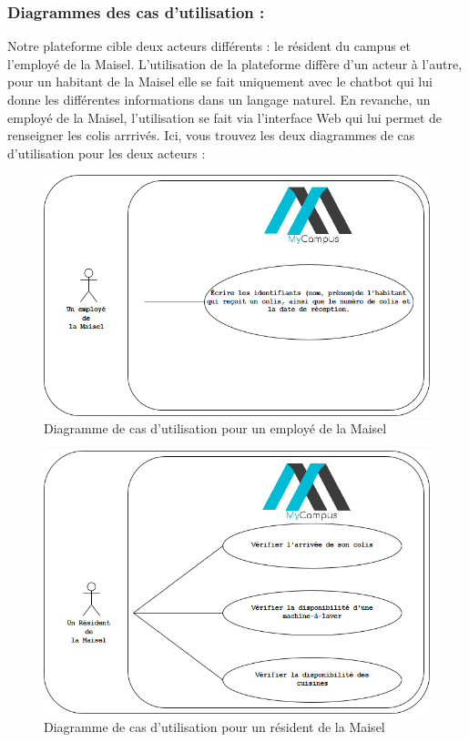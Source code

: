 \documentclass[12pt]{report}
\begin{document}
\subsubsection{Diagrammes des cas d’utilisation : }
Notre plateforme cible deux acteurs différents : le résident du campus et l’employé de la Maisel.  L’utilisation de la plateforme diffère d’un acteur à l’autre, pour un habitant de la Maisel  elle se fait uniquement avec le chatbot qui lui donne les différentes informations dans un langage naturel. 
En revanche, un employé de la Maisel, l’utilisation se fait via l’interface Web qui lui permet de renseigner les colis arrrivés.
Ici, vous trouvez les deux diagrammes de cas d’utilisation pour les deux acteurs : 
\begin{figure}[]
\begin{center}
\includegraphics[scale=0.5]{diag_utili.png}
\caption{Diagramme de cas d'utilisation pour un employé de la Maisel}
\end{center}
\end{figure}

\begin{figure}[]
\begin{center}
\includegraphics[scale=0.5]{diag_utili2.png}
\caption{Diagramme de cas d'utilisation pour un résident de la Maisel}
\end{center}
\end{figure}
\end{document}
